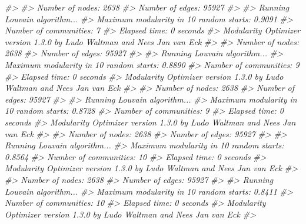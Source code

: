 \documentclass[
]{book}
\newenvironment{Shaded}{\begin{snugshade}}{\end{snugshade}}
\newcommand{\CommentTok}[1]{\textcolor[rgb]{0.56,0.35,0.01}{\textit{#1}}}
\begin{document}
\begin{Shaded}
\begin{Highlighting}[]
\CommentTok{\#\textgreater{} }
\CommentTok{\#\textgreater{} Number of nodes: 2638}
\CommentTok{\#\textgreater{} Number of edges: 95927}
\CommentTok{\#\textgreater{} }
\CommentTok{\#\textgreater{} Running Louvain algorithm...}
\CommentTok{\#\textgreater{} Maximum modularity in 10 random starts: 0.9091}
\CommentTok{\#\textgreater{} Number of communities: 7}
\CommentTok{\#\textgreater{} Elapsed time: 0 seconds}
\CommentTok{\#\textgreater{} Modularity Optimizer version 1.3.0 by Ludo Waltman and Nees Jan van Eck}
\CommentTok{\#\textgreater{} }
\CommentTok{\#\textgreater{} Number of nodes: 2638}
\CommentTok{\#\textgreater{} Number of edges: 95927}
\CommentTok{\#\textgreater{} }
\CommentTok{\#\textgreater{} Running Louvain algorithm...}
\CommentTok{\#\textgreater{} Maximum modularity in 10 random starts: 0.8890}
\CommentTok{\#\textgreater{} Number of communities: 9}
\CommentTok{\#\textgreater{} Elapsed time: 0 seconds}
\CommentTok{\#\textgreater{} Modularity Optimizer version 1.3.0 by Ludo Waltman and Nees Jan van Eck}
\CommentTok{\#\textgreater{} }
\CommentTok{\#\textgreater{} Number of nodes: 2638}
\CommentTok{\#\textgreater{} Number of edges: 95927}
\CommentTok{\#\textgreater{} }
\CommentTok{\#\textgreater{} Running Louvain algorithm...}
\CommentTok{\#\textgreater{} Maximum modularity in 10 random starts: 0.8728}
\CommentTok{\#\textgreater{} Number of communities: 9}
\CommentTok{\#\textgreater{} Elapsed time: 0 seconds}
\CommentTok{\#\textgreater{} Modularity Optimizer version 1.3.0 by Ludo Waltman and Nees Jan van Eck}
\CommentTok{\#\textgreater{} }
\CommentTok{\#\textgreater{} Number of nodes: 2638}
\CommentTok{\#\textgreater{} Number of edges: 95927}
\CommentTok{\#\textgreater{} }
\CommentTok{\#\textgreater{} Running Louvain algorithm...}
\CommentTok{\#\textgreater{} Maximum modularity in 10 random starts: 0.8564}
\CommentTok{\#\textgreater{} Number of communities: 10}
\CommentTok{\#\textgreater{} Elapsed time: 0 seconds}
\CommentTok{\#\textgreater{} Modularity Optimizer version 1.3.0 by Ludo Waltman and Nees Jan van Eck}
\CommentTok{\#\textgreater{} }
\CommentTok{\#\textgreater{} Number of nodes: 2638}
\CommentTok{\#\textgreater{} Number of edges: 95927}
\CommentTok{\#\textgreater{} }
\CommentTok{\#\textgreater{} Running Louvain algorithm...}
\CommentTok{\#\textgreater{} Maximum modularity in 10 random starts: 0.8411}
\CommentTok{\#\textgreater{} Number of communities: 10}
\CommentTok{\#\textgreater{} Elapsed time: 0 seconds}
\CommentTok{\#\textgreater{} Modularity Optimizer version 1.3.0 by Ludo Waltman and Nees Jan van Eck}
\CommentTok{\#\textgreater{} }

\end{Highlighting}
\end{Shaded}
\end{document}

